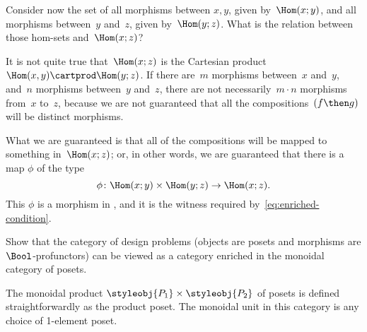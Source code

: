 {\begin{example}
        Consider now the set of all morphisms between $x, y$, given by~$\Hom(x;y)$, and all morphisms between~$y$ and~$z$, given by~$\Hom(y; z)$.
        What is the relation between those hom-sets and~$\Hom(x; z)$?

        It is not quite true that~$\Hom(x; z)$ is the Cartesian product~$\Hom(x, y) \cartprod \Hom(y; z)$.
        If there are~$m$ morphisms between~$x$ and~$y$, and~$n$ morphisms between~$y$ and~$z$, there are not necessarily~$m \cdot n$ morphisms from~$x$ to~$z$, because we are not guaranteed that all the compositions~$(f\then g)$ will be distinct morphisms.

        What we are guaranteed is that all of the compositions will be mapped to something in~$\Hom(x; z)$; or, in other words, we are guaranteed that there is a map $\phi$ of the type
        \begin{equation*}
            \phi \colon \Hom(x; y) \times \Hom(y; z) \rightarrow \Hom(x; z).
        \end{equation*}
        This $\phi$ is a morphism in \Set, and it is the witness required by~\cref{eq:enriched-condition}.

    \end{example}
}

\begin{gradedexercise}
    \label{ex:DPIsEnrichedInPos}
    Show that the category of design problems (objects are posets and morphisms are $\Bool$-profunctors) can be viewed as a category enriched in the monoidal category of posets.



    The monoidal product $\styleobj{P_1} \times \styleobj{P_2}$ of posets is defined straightforwardly as the product poset.
    The monoidal unit in this category is any choice of 1-element poset.
\end{gradedexercise}

